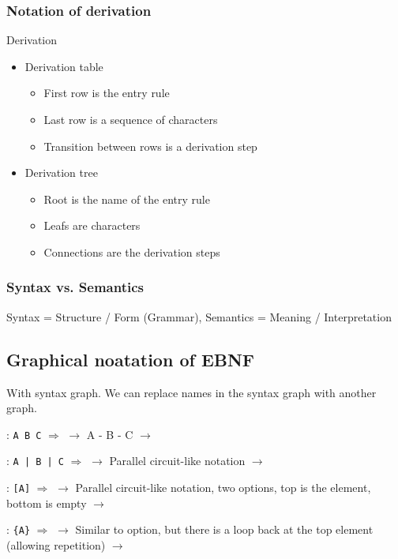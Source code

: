 \subsubsection{Notation of derivation}
\begin{notation}[]{Derivation}
    \begin{itemize}
        \item Derivation table
            \begin{itemize}
                \item First row is the entry rule
                \item Last row is a sequence of characters
                \item Transition between rows is a derivation step
            \end{itemize}
        \item Derivation tree
            \begin{itemize}
                \item Root is the name of the entry rule
                \item Leafs are characters
                \item Connections are the derivation steps
            \end{itemize}
    \end{itemize}
\end{notation}

\subsubsection{Syntax vs. Semantics}
Syntax = Structure / Form (Grammar), Semantics = Meaning / Interpretation

\subsection{Graphical noatation of EBNF}
With syntax graph. We can replace names in the syntax graph with another graph.

: \texttt{A B C} $\Longrightarrow$ $\rightarrow$ A - B - C $\rightarrow$

: \texttt{A | B | C} $\Longrightarrow$ $\rightarrow$ Parallel circuit-like notation $\rightarrow$

: \texttt{[A]} $\Longrightarrow$ $\rightarrow$ Parallel circuit-like notation, two options, top is the element, bottom is empty $\rightarrow$

: \texttt{\{A\}} $\Longrightarrow$ $\rightarrow$ Similar to option, but there is a loop back at the top element (allowing repetition) $\rightarrow$
